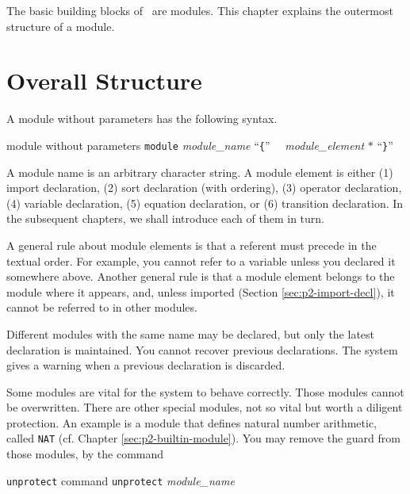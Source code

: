 \documentclass[a4paper]{memoir}
\begin{document}
The basic building blocks of \cafeobj~are modules. This chapter explains
the outermost structure of a module.

\section{Overall Structure}\label{sec:p2-module-decl-syntax}

A module without parameters has the following syntax.

\begin{bsyntax} module without parameters \Hline
\texttt{module} \textit{module\_name} ``\texttt{\{}''
~~\textit{module\_element} $*$
``\texttt{\}}''
\end{bsyntax}

A module name is an arbitrary character string.
A module element is either
(1) import declaration, (2) sort declaration (with ordering),
(3) operator declaration, (4) variable declaration, 
(5) equation declaration, or (6) transition declaration.
In the subsequent chapters, we shall introduce each of them in turn.

A general rule about module elements is that a referent must precede
in the textual order. For example, you cannot refer to a variable unless
you declared it somewhere above. Another general rule is that
a module element belongs to the module where it appears, and,
unless imported (Section \ref{sec:p2-import-decl}), it cannot be
referred to in other modules.

Different modules with the same name may be declared, but only the latest
declaration is maintained. You cannot recover previous declarations.
The system gives a warning when a previous declaration is discarded.

Some modules are vital for the system to behave correctly. Those modules
cannot be overwritten. There are other special modules, not so vital but
worth a diligent protection.
An example is a module that defines natural number
arithmetic, called \verb|NAT| (cf. Chapter \ref{sec:p2-builtin-module}).
You may remove the guard from those modules, by the command

\begin{bsyntax} \texttt{unprotect} command  \Hline
\texttt{unprotect} \textit{module\_name}
\end{bsyntax}
\end{document}
